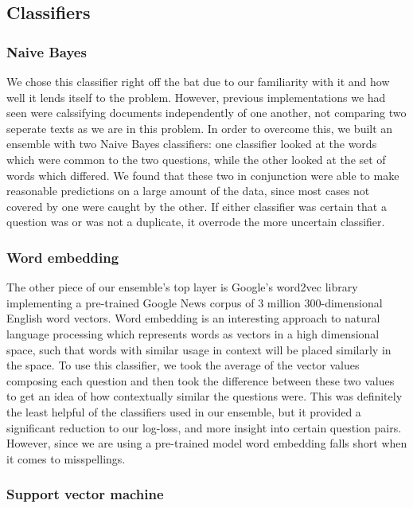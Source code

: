 \documentclass{article}
\begin{document}
\subsection{Classifiers}

\subsubsection{Naive Bayes}

We chose this classifier right off the bat due to our familiarity with it and
how well it lends itself to the problem. However, previous implementations we
had seen were calssifying documents independently of one another, not comparing
two seperate texts as we are in this problem. In order to overcome this, we
built an ensemble with two Naive Bayes classifiers: one classifier looked at the
words which were common to the two questions, while the other looked at the set
of words which differed. We found that these two in conjunction were able to
make reasonable predictions on a large amount of the data, since most cases not
covered by one were caught by the other. If either classifier was certain that a
question was or was not a duplicate, it overrode the more uncertain classifier.

\subsubsection{Word embedding}

The other piece of our ensemble's top layer is Google's word2vec library
implementing a pre-trained Google News corpus of 3 million 300-dimensional
English word vectors. Word embedding is an interesting approach to natural
language processing which represents words as vectors in a high dimensional
space, such that words with similar usage in context will be placed similarly in
the space. To use this classifier, we took the average of the vector values
composing each question and then took the difference between these two values to
get an idea of how contextually similar the questions were. This was definitely
the least helpful of the classifiers used in our ensemble, but it provided a
significant reduction to our log-loss, and more insight into certain question
pairs. However, since we are using a pre-trained model word embedding falls
short when it comes to misspellings.

\subsubsection{Support vector machine}
\end{document}
